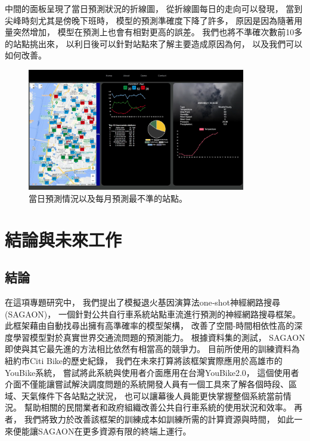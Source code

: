 \documentclass[a4paper,12pt]{extarticle}
\begin{document}
            中間的面板呈現了當日預測狀況的折線圖，
            從折線圖每日的走向可以發現，
            當到尖峰時刻尤其是傍晚下班時，
            模型的預測準確度下降了許多，
            原因是因為隨著用量突然增加，
            模型在預測上也會有相對更高的誤差。
            我們也將不準確次數前10多的站點挑出來，
            以利日後可以針對站點來了解主要造成原因為何，
            以及我們可以如何改善。
            \begin{figure}[htb]
                \centering
                \includegraphics[width=0.85\textwidth]{details.png}
                \caption{
                    當日預測情況以及每月預測最不準的站點。
                }
                \label{fig:details}
            \end{figure}

    \newpage
    \section{結論與未來工作}
        \subsection{結論}
        在這項專題研究中，
        我們提出了模擬退火基因演算法one‑shot神經網路搜尋(SAGAON)，
        一個針對公共自行車系統站點車流進行預測的神經網路搜尋框架。
        此框架藉由自動找尋出擁有高準確率的模型架構，
        改善了空間-時間相依性高的深度學習模型對於真實世界交通流問題的預測能力。
        根據資料集的測試，
        SAGAON即使與其它最先進的方法相比依然有相當高的競爭力。
        目前所使用的訓練資料為紐約市Citi Bike的歷史紀錄，
        我們在未來打算將該框架實際應用於高雄市的YouBike系統，
        嘗試將此系統與使用者介面應用在台灣YouBike2.0，
        這個使用者介面不僅能讓嘗試解決調度問題的系統開發人員有一個工具來了解各個時段、區域、天氣條件下各站點之狀況，
        也可以讓幕後人員能更快掌握整個系統當前情況。
        幫助相關的民間業者和政府組織改善公共自行車系統的使用狀況和效率。
        再者，
        我們將致力於改善該框架的訓練成本如訓練所需的計算資源與時間，
        如此一來便能讓SAGAON在更多資源有限的終端上運行。
\end{document}
